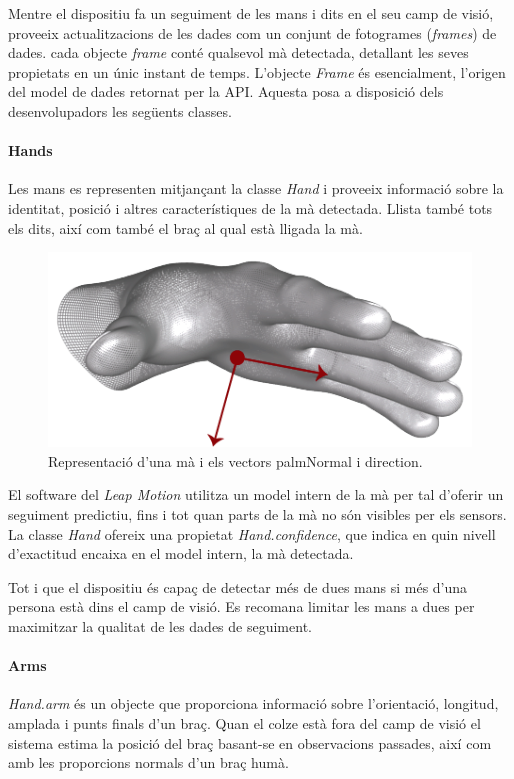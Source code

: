 \documentclass[12pt,a4paper,catalan]{article}
\begin{document}
	\vspace{5mm}
	Mentre el dispositiu fa un seguiment de les mans i dits en el seu camp de visió, proveeix actualitzacions de les dades com un conjunt de fotogrames (\textit{frames}) de dades. cada objecte \textit{frame} conté qualsevol mà detectada, detallant les seves propietats en un únic instant de temps. L'objecte \textit{Frame} és esencialment, l'origen del model de dades retornat per la API.
	Aquesta posa a disposició dels desenvolupadors les següents classes.
	
	\paragraph{Hands}
	Les mans es representen mitjançant la classe \textit{Hand} i proveeix informació sobre la identitat, posició i altres característiques de la mà detectada. Llista també tots els dits, així com també el braç al qual està lligada la mà.
	\begin{figure}[H]
		\includegraphics[width=\textwidth,keepaspectratio]{leap-hand-model.png}
		\centering
		\caption{Representació d'una mà i els vectors palmNormal i direction.}
		\label{fig:leap-hand}
	\end{figure}
	El software del \textit{Leap Motion} utilitza un model intern de la mà per tal d'oferir un seguiment predictiu, fins i tot quan parts de la mà no són visibles per els sensors. La classe \textit{Hand} ofereix una propietat \textit{Hand.confidence}, que indica en quin nivell d'exactitud encaixa en el model intern, la mà detectada.
	
	Tot i que el dispositiu és capaç de detectar més de dues mans si més d'una persona està dins el camp de visió. Es recomana limitar les mans a dues per maximitzar la qualitat de les dades de seguiment.
	\paragraph{Arms}
	\textit{Hand.arm} és un objecte que proporciona informació sobre l'orientació, longitud, amplada i punts finals d'un braç. Quan el colze està fora del camp de visió el sistema estima la posició del braç basant-se en observacions passades, així com amb les proporcions normals d'un braç humà.
\end{document}
